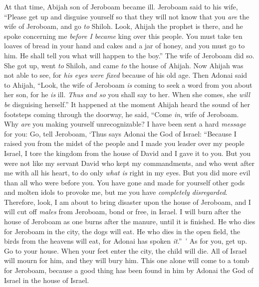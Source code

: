 \begin{biblechapter} %
 At that time, Abijah son of Jeroboam became ill.
\verse Jeroboam said to his wife, “Please get up and disguise yourself so that they will not know that you \textit{are} the wife of Jeroboam, and go \textit{to} Shiloh. Look, Ahijah the prophet is there, and he spoke concerning me \textit{before I became} king over this people.
\verse You must take ten loaves of bread in your hand and cakes and a jar of honey, and you must go to him. He shall tell you what will happen to the boy.”
\verse The wife of Jeroboam did so. She got up, went \textit{to} Shiloh, and came \textit{to} the house of Ahijah. Now Ahijah was not able to see, for \textit{his eyes were fixed} because of his old age.
\verse Then Adonai said to Ahijah, “Look, the wife of Jeroboam \textit{is} coming to seek a word from you about her son, for he \textit{is} ill. \textit{Thus and so} you shall say to her. When she comes, she \textit{will be} disguising herself.”
\verse It happened at the moment Ahijah heard the sound of her footsteps coming through the doorway, he said, “Come \textit{in}, wife of Jeroboam. Why \textit{are} you making yourself unrecognizable? I have been sent a hard \textit{message} for you:
\verse Go, tell Jeroboam, ‘Thus says Adonai the God of Israel: “Because I raised you from the midst of the people and I made you leader over my people Israel,
\verse I tore the kingdom from the house of David and I gave it to you. But you were not like my servant David who kept my commandments, and who went after me with all his heart, to do only \textit{what is} right in my eyes.
\verse But you did more evil than all who were before you. You have gone and made for yourself other gods and molten idols to provoke me, but me you have \textit{completely disregarded}.
\verse Therefore, look, I am about to bring disaster upon the house of Jeroboam, and I will cut off \textit{males} from Jeroboam, bond or free, in Israel. I will burn after the house of Jeroboam as one burns after the manure, until it is finished.
\verse He who dies for Jeroboam in the city, the dogs will eat. He who dies in the open field, the birds from the heavens will eat, for Adonai has spoken \textit{it}.” ’
\verse As for you, get up. Go to your house. When your feet enter the city, the child will die.
\verse All of Israel will mourn for him, and they will bury him. This one alone will come to a tomb for Jeroboam, because a good thing has been found in him by Adonai the God of Israel in the house of Israel.

\end{biblechapter}
